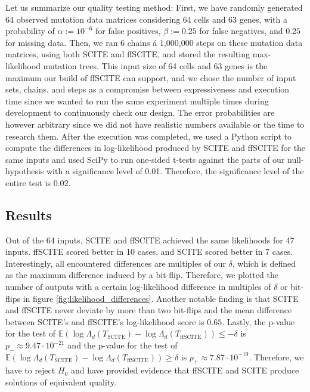 Let us summarize our quality testing method: First, we have randomly generated 64 observed mutation data matrices considering 64 cells and 63 genes, with a probability of $\alpha := 10^{-6}$ for false positives, $\beta := 0.25$ for false negatives, and $0.25$ for missing data. Then, we ran 6 chains á 1,000,000 steps on these mutation data matrices, using both \ac{SCITE} and \ac{ffSCITE}, and stored the resulting max-likelihood mutation trees. This input size of 64 cells and 63 genes is the maximum our build of \ac{ffSCITE} can support, and we chose the number of input sets, chains, and steps as a compromise between expressiveness and execution time since we wanted to run the same experiment multiple times during development to continuously check our design. The error probabilities are however arbitrary since we did not have realistic numbers available or the time to research them. After the execution was completed, we used a Python script to compute the differences in log-likelihood produced by \ac{SCITE} and \ac{ffSCITE} for the same inputs and used SciPy to run one-sided t-tests against the parts of our null-hypothesis with a significance level of 0.01. Therefore, the significance level of the entire test is 0.02.

\subsection{Results}

Out of the 64 inputs, \ac{SCITE} and \ac{ffSCITE} achieved the same likelihoods for 47 inputs. \ac{ffSCITE} scored better in 10 cases, and \ac{SCITE} scored better in 7 cases. Interestingly, all encountered differences are multiples of our $\delta$, which is defined as the maximum difference induced by a bit-flip. Therefore, we plotted the number of outputs with a certain log-likelihood difference in multiples of $\delta$ or bit-flips in figure \ref{fig:likelihood_differences}. Another notable finding is that \ac{SCITE} and \ac{ffSCITE} never deviate by more than two bit-flips and the mean difference between \ac{SCITE}'s and \ac{ffSCITE}'s log-likelihood score is $0.65$. Lastly, the p-value for the test of $\mathbb{E} \left(\log\Lambda_d(T_\mathrm{SCITE}) - \log\Lambda_d(T_\mathrm{ffSCITE})\right) \leq - \delta$ is $p_- \approx 9.47 \cdot 10^{-21}$ and the p-value for the test of $\mathbb{E} \left(\log\Lambda_d(T_\mathrm{SCITE}) - \log\Lambda_d(T_\mathrm{ffSCITE})\right) \geq \delta$ is $p_+ \approx 7.87 \cdot 10^{-19}$. Therefore, we have to reject $H_0$ and have provided evidence that \ac{ffSCITE} and \ac{SCITE} produce solutions of equivalent quality.

